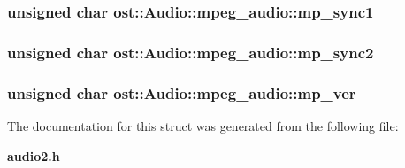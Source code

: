 \subsubsection[{mp\_\-sync1}]{\setlength{\rightskip}{0pt plus 5cm}unsigned char {\bf ost::Audio::mpeg\_\-audio::mp\_\-sync1}}\label{structost_1_1_audio_1_1mpeg__audio_a0616c2cf1ca66cc7d4e6e723cd1a1a8c}
\subsubsection[{mp\_\-sync2}]{\setlength{\rightskip}{0pt plus 5cm}unsigned char {\bf ost::Audio::mpeg\_\-audio::mp\_\-sync2}}\label{structost_1_1_audio_1_1mpeg__audio_a912522e501564727926bda6fa1751bb4}
\subsubsection[{mp\_\-ver}]{\setlength{\rightskip}{0pt plus 5cm}unsigned char {\bf ost::Audio::mpeg\_\-audio::mp\_\-ver}}\label{structost_1_1_audio_1_1mpeg__audio_a33787fdb19fef66e02011746cb6a258a}


The documentation for this struct was generated from the following file:\begin{DoxyCompactItemize}
\item 
{\bf audio2.h}\end{DoxyCompactItemize}
